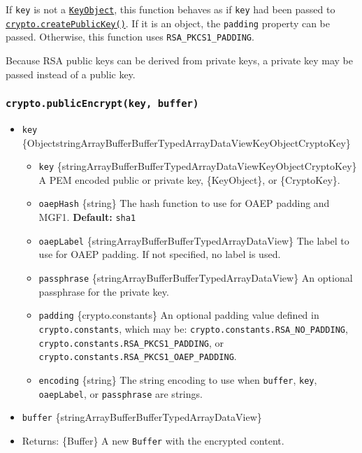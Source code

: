 If \texttt{key} is not a \hyperref[class-keyobject]{\texttt{KeyObject}},
this function behaves as if \texttt{key} had been passed to
\hyperref[cryptocreatepublickeykey]{\texttt{crypto.createPublicKey()}}.
If it is an object, the \texttt{padding} property can be passed.
Otherwise, this function uses \texttt{RSA\_PKCS1\_PADDING}.

Because RSA public keys can be derived from private keys, a private key
may be passed instead of a public key.

\subsubsection{\texorpdfstring{\texttt{crypto.publicEncrypt(key,\ buffer)}}{crypto.publicEncrypt(key, buffer)}}\label{crypto.publicencryptkey-buffer}

\begin{itemize}
\tightlist
\item
  \texttt{key}
  \{Object\textbar string\textbar ArrayBuffer\textbar Buffer\textbar TypedArray\textbar DataView\textbar KeyObject\textbar CryptoKey\}

  \begin{itemize}
  \tightlist
  \item
    \texttt{key}
    \{string\textbar ArrayBuffer\textbar Buffer\textbar TypedArray\textbar DataView\textbar KeyObject\textbar CryptoKey\}
    A PEM encoded public or private key, \{KeyObject\}, or
    \{CryptoKey\}.
  \item
    \texttt{oaepHash} \{string\} The hash function to use for OAEP
    padding and MGF1. \textbf{Default:}
    \texttt{\textquotesingle{}sha1\textquotesingle{}}
  \item
    \texttt{oaepLabel}
    \{string\textbar ArrayBuffer\textbar Buffer\textbar TypedArray\textbar DataView\}
    The label to use for OAEP padding. If not specified, no label is
    used.
  \item
    \texttt{passphrase}
    \{string\textbar ArrayBuffer\textbar Buffer\textbar TypedArray\textbar DataView\}
    An optional passphrase for the private key.
  \item
    \texttt{padding} \{crypto.constants\} An optional padding value
    defined in \texttt{crypto.constants}, which may be:
    \texttt{crypto.constants.RSA\_NO\_PADDING},
    \texttt{crypto.constants.RSA\_PKCS1\_PADDING}, or
    \texttt{crypto.constants.RSA\_PKCS1\_OAEP\_PADDING}.
  \item
    \texttt{encoding} \{string\} The string encoding to use when
    \texttt{buffer}, \texttt{key}, \texttt{oaepLabel}, or
    \texttt{passphrase} are strings.
  \end{itemize}
\item
  \texttt{buffer}
  \{string\textbar ArrayBuffer\textbar Buffer\textbar TypedArray\textbar DataView\}
\item
  Returns: \{Buffer\} A new \texttt{Buffer} with the encrypted content.
\end{itemize}

